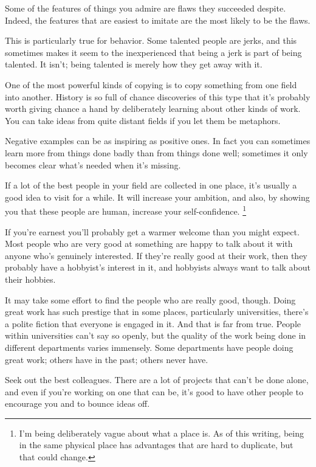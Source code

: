 Some of the features of things you admire are flaws they succeeded
despite. Indeed, the features that are easiest to imitate are the most
likely to be the flaws.

This is particularly true for behavior. Some talented people are jerks,
and this sometimes makes it seem to the inexperienced that being a jerk
is part of being talented. It isn't; being talented is merely how they
get away with it.

One of the most powerful kinds of copying is to copy something from one
field into another. History is so full of chance discoveries of this
type that it's probably worth giving chance a hand by deliberately
learning about other kinds of work. You can take ideas from quite
distant fields if you let them be metaphors.

Negative examples can be as inspiring as positive ones. In fact you can
sometimes learn more from things done badly than from things done well;
sometimes it only becomes clear what's needed when it's missing.

If a lot of the best people in your field are collected in one place,
it's usually a good idea to visit for a while. It will increase your
ambition, and also, by showing you that these people are human, increase
your self-confidence. \footnote{I'm being deliberately vague about what a place is. As of this
writing, being in the same physical place has advantages that are hard
to duplicate, but that could change.}

If you're earnest you'll probably get a warmer welcome than you might
expect. Most people who are very good at something are happy to talk
about it with anyone who's genuinely interested. If they're really good
at their work, then they probably have a hobbyist's interest in it, and
hobbyists always want to talk about their hobbies.

It may take some effort to find the people who are really good, though.
Doing great work has such prestige that in some places, particularly
universities, there's a polite fiction that everyone is engaged in it.
And that is far from true. People within universities can't say so
openly, but the quality of the work being done in different departments
varies immensely. Some departments have people doing great work; others
have in the past; others never have.

Seek out the best colleagues. There are a lot of projects that can't be
done alone, and even if you're working on one that can be, it's good to
have other people to encourage you and to bounce ideas off.

